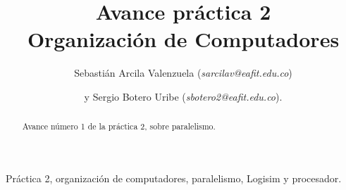 \documentclass[%
	final,
	notitlepage,
	narroweqnarray,
	inline,
	twoside,
	]{ieee}
\begin{document}
\title[Avance práctica 2]{%
       Avance práctica 2 \\  Organización de Computadores}

\author[]{Sebastián Arcila Valenzuela (\textit{sarcilav@eafit.edu.co})
\and{}y Sergio Botero Uribe (\textit{sbotero2@eafit.edu.co}).
}


\titletext{, \today} 


\maketitle               

\begin{abstract} 
Avance número 1 de la práctica 2, sobre paralelismo.
\end{abstract}

\begin{keywords}
Práctica 2, organización de computadores, paralelismo, Logisim y procesador.
\end{keywords}
\end{document}
